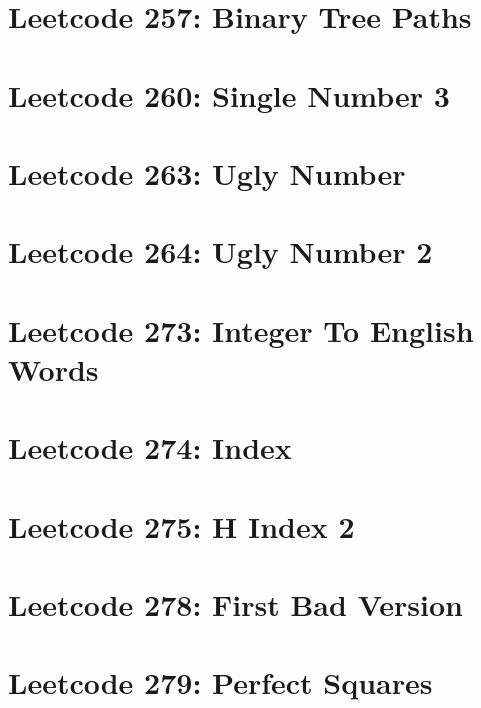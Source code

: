 \documentclass{article}
\begin{document}
\section*{Leetcode 257: Binary Tree Paths}

\pagebreak 

\section*{Leetcode 260: Single Number 3}

\pagebreak 

\section*{Leetcode 263: Ugly Number}

\pagebreak 

\section*{Leetcode 264: Ugly Number 2}

\pagebreak 

\section*{Leetcode 273: Integer To English Words}

\pagebreak 

\section*{Leetcode 274: Index}

\pagebreak 

\section*{Leetcode 275: H Index 2}

\pagebreak 

\section*{Leetcode 278: First Bad Version}

\pagebreak 

\section*{Leetcode 279: Perfect Squares}

\pagebreak 
\end{document}
